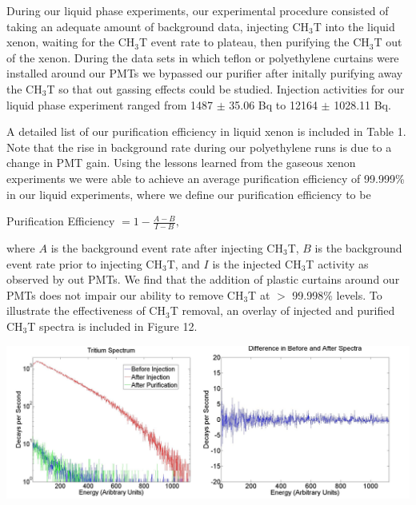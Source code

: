 \documentclass[a4paper,12pt]{article}
\begin{document}
During our liquid phase experiments, our experimental procedure consisted of taking an adequate amount of background data, injecting CH$_3$T into the liquid xenon, waiting for the CH$_3$T event rate to plateau, then purifying the CH$_3$T out of the xenon.  During the data sets in which teflon or polyethylene curtains were installed around our PMTs we bypassed our purifier after initally purifying away the CH$_3$T so that out gassing effects could be studied.  Injection activities for our liquid phase experiment ranged from 1487 $\pm$ 35.06 Bq to 12164 $\pm$ 1028.11 Bq.  

A detailed list of our purification efficiency in liquid xenon is included in Table 1.  Note that the rise in background rate during our polyethylene runs is due to a change in PMT gain.  Using the lessons learned from the gaseous xenon experiments we were able to achieve an average purification efficiency of 99.999\% in our liquid experiments, where we define our purification efficiency to be

\begin{center}
Purification Efficiency $= 1 - \frac{A - B}{I - B},$
\end{center}

\noindent
where $A$ is the background event rate after injecting CH$_3$T, $B$ is the background event rate prior to injecting CH$_3$T, and $I$ is the injected CH$_3$T activity as observed by out PMTs.  We find that the addition of plastic curtains around our PMTs does not impair our ability to remove CH$_3$T at $>$ 99.998\% levels.  To illustrate the effectiveness of CH$_3$T removal, an overlay of injected and purified CH$_3$T spectra is included in Figure 12.  

\begin{center}
\includegraphics[scale=0.5]{spectra.png}
\end{center}
\end{document}
